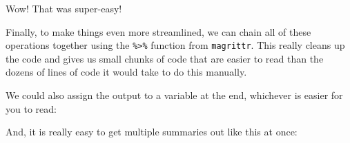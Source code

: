 \documentclass[
]{book}
\newenvironment{Shaded}{\begin{snugshade}}{\end{snugshade}}
\newcommand{\CommentTok}[1]{\textcolor[rgb]{0.56,0.35,0.01}{\textit{#1}}}
\newcommand{\DataTypeTok}[1]{\textcolor[rgb]{0.13,0.29,0.53}{#1}}
\newcommand{\KeywordTok}[1]{\textcolor[rgb]{0.13,0.29,0.53}{\textbf{#1}}}
\newcommand{\NormalTok}[1]{#1}
\newcommand{\OperatorTok}[1]{\textcolor[rgb]{0.81,0.36,0.00}{\textbf{#1}}}
\newcommand{\StringTok}[1]{\textcolor[rgb]{0.31,0.60,0.02}{#1}}
\begin{document}
Wow! That was super-easy!

Finally, to make things even more streamlined, we can chain all of these operations together using the \texttt{\%\textgreater{}\%} function from \texttt{magrittr}. This really cleans up the code and gives us small chunks of code that are easier to read than the dozens of lines of code it would take to do this manually.

\begin{Shaded}
\end{Shaded}

We could also assign the output to a variable at the end, whichever is easier for you to read:

\begin{Shaded}
\end{Shaded}

And, it is really easy to get multiple summaries out like this at once:

\begin{Shaded}
\end{Shaded}
\end{document}
